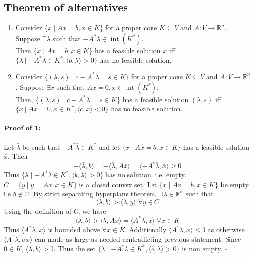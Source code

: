 \documentclass[a4paper,11pt]{article}
\newcommand{\intr}{\operatorname{int}}
\newcommand{\Rn}{\mathbb{R}^n}
\newcommand\inrpd[2]{\langle #1, #2 \rangle}
\begin{document}
\subsection{Theorem of alternatives}
\begin{enumerate}
\item Consider $\{x \mid Ax = b, x\in K \}$ for a proper cone $K \subseteq V$ and $A: V \rightarrow \Rn$. Suppose $\exists \lambda$ such that $-A^* \lambda \in \intr(K^*)$. \\
Then $\{x \mid Ax = b, x\in K \}$ has a  feasible solution $x$ iff $\{\lambda \mid  -A^* \lambda \in K^*, \inrpd{b}{\lambda} >0\}$ has no feasible solution.

\item Consider $\{(\lambda,s) \mid c - A^*\lambda  = s \in K \}$ for a proper cone $K \subseteq V$ and $A: V \rightarrow \Rn$. Suppose $\exists x$ such that $Ax = 0, x \in \intr(K^*)$. \\
Then, $\{(\lambda,s) \mid c - A^*\lambda  = s \in K \}$  has a  feasible solution $(\lambda,s)$ iff $\{x \mid Ax = 0, x\in K^*, \inrpd{c}{x} < 0 \}$ has no feasible solution.
\end{enumerate}

\paragraph{Proof of 1:}
Let $\bar{\lambda}$ be such that $-A^* \bar{\lambda} \in K^* $ and let $\{x \mid Ax = b, x\in K \}$ has a feasible solution $\bar{x}$. Then
\[
-\inrpd{\bar{\lambda}}{b} = -\inrpd{\bar{\lambda}}{A\bar{x}} = \inrpd{-A^*\bar{\lambda}}{\bar{x}} \geq 0
\]
Thus $\{\lambda \mid  -A^* \lambda \in K^*, \inrpd{b}{\lambda} >0\}$ has no solution, i.e. empty.
\\

$C= \{y \mid y = Ax, x\in K \}$ is a closed convex set.
Let $\{x \mid Ax = b, x\in K \}$ be empty. i.e $b \notin C$. By strict separating hyperplane theorem, $\exists \lambda \in \Rn$ such that 
\[ \inrpd{\lambda}{b} > \inrpd{\lambda}{y}\; \forall y \in C\]
Using the definition of $C$, we have 
\[ \inrpd{\lambda}{b} > \inrpd{\lambda}{Ax} =  \inrpd{A^*\lambda}{x}\; \forall x \in K\]
Thus $\inrpd{A^*\lambda}{x}$ is bounded above $\forall x \in K$. Additionally $\inrpd{A^*\lambda}{x} \leq 0$ as otherwise $\inrpd{A^*\lambda}{\alpha x}$ can made as large as needed contradicting previous statement. Since $0 \in K$, $\inrpd{\lambda}{b} >0$. 
Thus the set $\{\lambda \mid  -A^* \lambda \in K^*, \inrpd{b}{\lambda} >0\}$ is non empty.
$\square$
\end{document}
